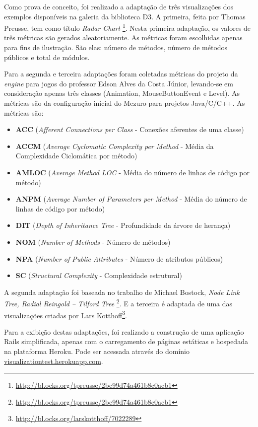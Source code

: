 Como prova de conceito, foi realizado a adaptação de três visualizações dos
exemplos disponíveis na galeria da biblioteca D3. A primeira, feita por Thomas
Preusse, tem como título \textit{Radar Chart}
\footnote{\url{http://bl.ocks.org/tpreusse/2bc99d74a461b8c0acb1}}. Nesta
primeira adaptação, os valores de três métricas são gerados aleatoriamente. As
métricas foram escolhidas apenas para fins de ilustração. São elas: número de
métodos, número de métodos públicos e total de módulos.

Para a segunda e terceira adaptações foram coletadas métricas do projeto da
\textit{engine} para jogos do professor Edson Alves da Costa Júnior, levando-se
em consideração apenas três classes (Animation, MouseButtonEvent e Level). As
métricas são da configuração inicial do Mezuro para projetos Java/C/C++. As
métricas são:

\begin{itemize}
  \item \textbf{ACC} (\textit{Afferent Connections per Class} - Conexões
	aferentes de uma classe)
  \item \textbf{ACCM} (\textit{Average Cyclomatic Complexity per Method} -
	Média da Complexidade Ciclomática por método)
  \item \textbf{AMLOC} (\textit{Average Method LOC} - Média do número de linhas
	de código por método)
  \item \textbf{ANPM} (\textit{Average Number of Parameters per Method} - Média
	do número de linhas de código por método)
  \item \textbf{DIT} (\textit{Depth of Inheritance Tree} - Profundidade da
	árvore de herança)
  \item \textbf{NOM} (\textit{Number of Methods} - Número de métodos)
  \item \textbf{NPA} (\textit{Number of Public Attributes} - Número de
	atributos públicos)
  \item \textbf{SC} (\textit{Structural Complexity} - Complexidade estrutural)
\end{itemize}

A segunda adaptação foi baseada no trabalho de Michael Bostock, \textit{Node
Link Tree, Radial Reingold – Tilford Tree}
\footnote{\url{http://bl.ocks.org/tpreusse/2bc99d74a461b8c0acb1}}. E a terceira
é adaptada de uma das visualizações criadas por Lars
Kotthoff\footnote{\url{http://bl.ocks.org/larskotthoff/7022289}}.

Para a exibição destas adaptações, foi realizado a construção de uma aplicação
Rails simplificada, apenas com o carregamento de páginas estáticas e hospedada
na plataforma Heroku. Pode ser acessada através do domínio
\href{https://visualizationtest.herokuapp.com/}{visualizationtest.herokuapp.com}.

